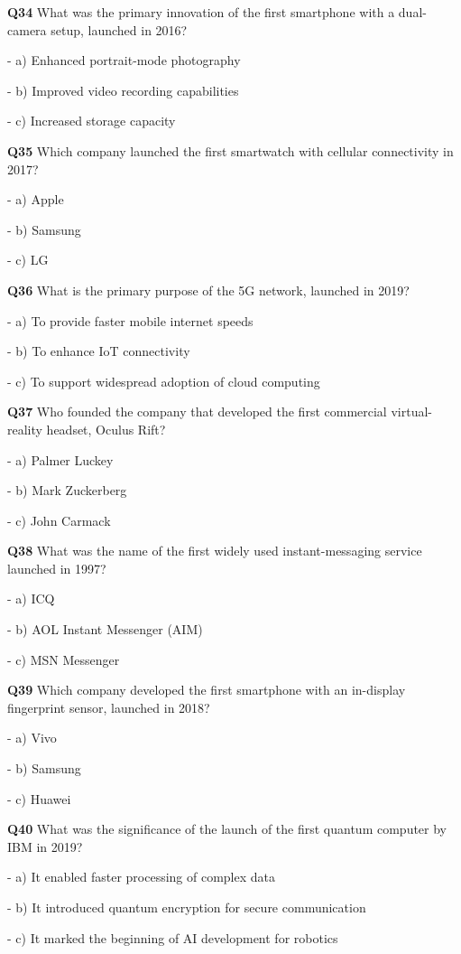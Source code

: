 \textbf{Q34} What was the primary innovation of the first smartphone with a dual-camera setup, launched in 2016?\par
\quad - a) Enhanced portrait-mode photography\par
\quad - b) Improved video recording capabilities\par
\quad - c) Increased storage capacity\par

\textbf{Q35} Which company launched the first smartwatch with cellular connectivity in 2017?\par
\quad - a) Apple\par
\quad - b) Samsung\par
\quad - c) LG\par

\textbf{Q36} What is the primary purpose of the 5G network, launched in 2019?\par
\quad - a) To provide faster mobile internet speeds\par
\quad - b) To enhance IoT connectivity\par
\quad - c) To support widespread adoption of cloud computing\par

\textbf{Q37} Who founded the company that developed the first commercial virtual-reality headset, Oculus Rift?\par
\quad - a) Palmer Luckey\par
\quad - b) Mark Zuckerberg\par
\quad - c) John Carmack\par

\textbf{Q38} What was the name of the first widely used instant-messaging service launched in 1997?\par
\quad - a) ICQ\par
\quad - b) AOL Instant Messenger (AIM)\par
\quad - c) MSN Messenger\par

\textbf{Q39} Which company developed the first smartphone with an in-display fingerprint sensor, launched in 2018?\par
\quad - a) Vivo\par
\quad - b) Samsung\par
\quad - c) Huawei\par

\textbf{Q40} What was the significance of the launch of the first quantum computer by IBM in 2019?\par
\quad - a) It enabled faster processing of complex data\par
\quad - b) It introduced quantum encryption for secure communication\par
\quad - c) It marked the beginning of AI development for robotics\par